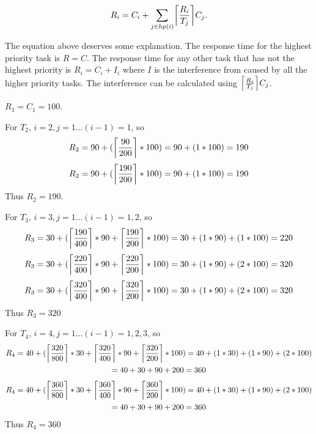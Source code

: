 \documentclass[10pt]{article}
\DeclarePairedDelimiter\ceil{\lceil}{\rceil}
\begin{document}
\begin{equation}
    R_i = C_i + \sum_{j \in hp(i)}^{} \ceil*{\frac{R_i}{T_j}}C_j.
\end{equation}

The equation above deserves some explanation.
The response time for the highest priority task is $R = C$.
The response time for any other task that has not the highest priority is $R_i = C_i + I_i$ where $I$ is the interference from caused by all the higher priority tasks.
The interference can be calculated using $\ceil*{\frac{R_i}{T_j}}C_j$.

$R_1 = C_1 = 100$.

For $T_2$, $i=2, j=1\dots (i-1) = 1$, so
\begin{equation}
    R_2 = 90 + (\ceil*{\frac{90}{200}} * 100) = 90 + (1 * 100) = 190
\end{equation}
\begin{equation}
    R_2 = 90 + (\ceil*{\frac{190}{200}} * 100) = 90 + (1 * 100) = 190
\end{equation}
Thus $R_2 = 190$.

For $T_3$, $i=3, j=1\dots (i-1) = 1,2$, so
\begin{equation}
    R_3 = 30 + (\ceil*{\frac{190}{400}} * 90 + \ceil*{\frac{190}{200}} * 100) = 30 + (1 * 90) + (1 * 100) = 220 
\end{equation}
\begin{equation}
    R_3 = 30 + (\ceil*{\frac{220}{400}} * 90 + \ceil*{\frac{220}{200}} * 100) = 30 + (1 * 90) + (2 * 100) = 320 
\end{equation}
\begin{equation}
    R_3 = 30 + (\ceil*{\frac{320}{400}} * 90 + \ceil*{\frac{320}{200}} * 100) = 30 + (1 * 90) + (2 * 100) = 320 
\end{equation}
Thus $R_3 = 320$
\newpage

For $T_4$, $i=4, j=1\dots (i-1) = 1,2,3$, so
\begin{multline}
    R_4 = 40 + (\ceil*{\frac{320}{800}} * 30 + \ceil*{\frac{320}{400}} * 90 + \ceil*{\frac{320}{200}} * 100) = 40 + (1 * 30) + (1 * 90) + (2 * 100) \\ = 40 + 30 + 90 + 200 = 360 
\end{multline}
\begin{multline}
    R_4 = 40 + (\ceil*{\frac{360}{800}} * 30 + \ceil*{\frac{360}{400}} * 90 + \ceil*{\frac{360}{200}} * 100) = 40 + (1 * 30) + (1 * 90) + (2 * 100) \\ = 40 + 30 + 90 + 200 = 360 
\end{multline}
Thus $R_4 = 360$
\end{document}
